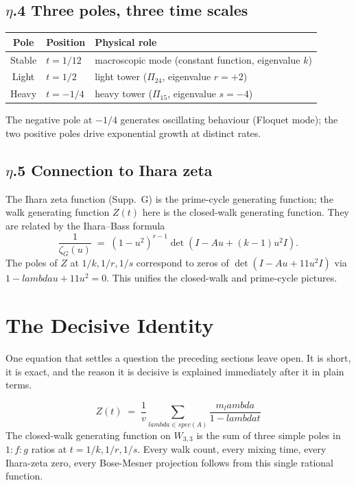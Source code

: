 \documentclass[12pt,a4paper]{article}
\def\mathrm#1{#1}%
\def\lambda{lambda}%
\theoremstyle{definition}
\begin{document}
\subsection*{$\eta$.4 \quad Three poles, three time scales}
\begin{center}
\begin{tabular}{cll}
\toprule
Pole & Position & Physical role \\
\midrule
Stable & $t = 1/12$ & macroscopic mode (constant function, eigenvalue $k$) \\
Light & $t = 1/2$ & light tower ($\Pi_{24}$, eigenvalue $r=+2$) \\
Heavy & $t = -1/4$ & heavy tower ($\Pi_{15}$, eigenvalue $s=-4$) \\
\bottomrule
\end{tabular}
\end{center}
The negative pole at $-1/4$ generates oscillating behaviour (Floquet
mode); the two positive poles drive exponential growth at distinct
rates.

\subsection*{$\eta$.5 \quad Connection to Ihara zeta}
The Ihara zeta function (Supp.~G) is the prime-cycle generating
function; the walk generating function $Z(t)$ here is the closed-walk
generating function. They are related by the Ihara--Bass formula
\[
\frac{1}{\zeta_G(u)} \;=\; (1-u^2)^{r-1}\det(I - Au + (k-1)u^2 I).
\]
The poles of $Z$ at $1/k, 1/r, 1/s$ correspond to zeros of
$\det(I - Au + 11 u^2 I)$ via $1 - \lambda u + 11u^2 = 0$. This
unifies the closed-walk and prime-cycle pictures.

\section*{The Decisive Identity}

\begin{plainbox}
One equation that settles a question the preceding sections leave open. It is short,
it is exact, and the reason it is decisive is explained immediately after it in plain
terms.
\end{plainbox}


\[
\boxed{\;Z(t) \;=\; \frac{1}{v}\sum_{\lambda\in\mathrm{spec}(A)} \frac{m_\lambda}{1 - \lambda t}\;}
\]
The closed-walk generating function on $W_{3,3}$ is the sum of three
simple poles in $1:f:g$ ratios at $t = 1/k, 1/r, 1/s$. Every walk
count, every mixing time, every Ihara-zeta zero, every Bose-Mesner
projection follows from this single rational function.
\end{document}
